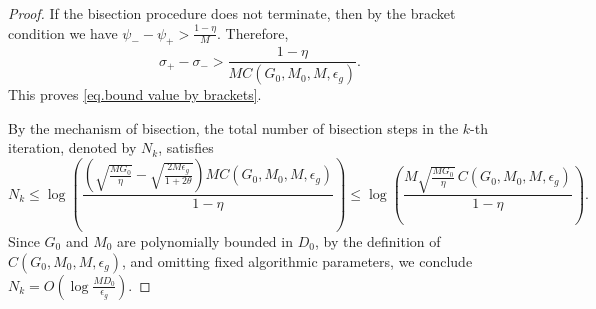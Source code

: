 \documentclass{article}
\begin{document}
\begin{proof}
    If the bisection procedure does not terminate, then by the bracket condition
    we have
    \(
    \psi_- - \psi_+
    >
    \frac{1-\eta}{M}.
    \)
    Therefore,
    \[
        \sigma_+-\sigma_-
        >
        \frac{1-\eta}
        {M C(G_0,M_0,M,\epsilon_g)}.
    \]
    This proves \eqref{eq.bound value by brackets}.

    By the mechanism of bisection, the total number of bisection steps in the
    \(k\)-th iteration, denoted by \(N_k\), satisfies
    \[
        N_k
        \le
        \log\left(
        \frac{
                \left(
                \sqrt{\frac{MG_0}{\eta}}
                -
                \sqrt{\frac{2M\epsilon_g}{1+2\theta}}
                \right)
                M C(G_0,M_0,M,\epsilon_g)
            }{
                1-\eta
            }
        \right)
        \le
        \log\left(
        \frac{
                M\sqrt{\frac{MG_0}{\eta}}\,
                C(G_0,M_0,M,\epsilon_g)
            }{
                1-\eta
            }
        \right).
    \]
    Since \(G_0\) and \(M_0\) are polynomially bounded in \(D_0\), by the
    definition of \(C(G_0,M_0,M,\epsilon_g)\), and omitting fixed algorithmic
    parameters, we conclude
    \(
    N_k
    =
    O\left(
    \log\frac{MD_0}{\epsilon_g}
    \right).
    \)
\end{proof}
\end{document}
